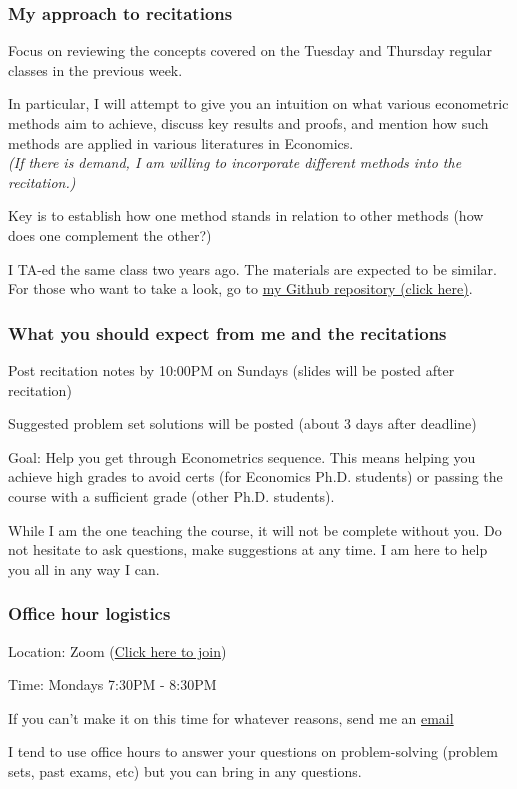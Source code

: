 \documentclass[aspectratio=169]{beamer}
\newenvironment{wideitemize}{\itemize\addtolength{\itemsep}{10pt}}{\enditemize}
\begin{document}
\begin{frame}
\frametitle{My approach to recitations}
\begin{wideitemize}
\item  Focus on reviewing the concepts covered on the Tuesday and Thursday regular classes in the previous week.
\item In particular, I will attempt to give you an intuition on what various econometric methods aim to achieve, discuss key results and proofs, and mention how such methods are applied in various literatures in Economics. \\
\textit{(If there is demand, I am willing to incorporate different methods into the recitation.)}
\item Key is to establish how one method stands in relation to other methods (how does one complement the other?)
\item I TA-ed the same class two years ago. The materials are expected to be similar. For those who want to take a look, go to \href{https://github.com/seunghunlee918/phd_econometrics}{my Github repository (click here)}.
 \end{wideitemize}
\end{frame}

\begin{frame}
\frametitle{What you should expect from me and the recitations}
\begin{wideitemize}
\item Post recitation notes by 10:00PM on Sundays (slides will be posted after recitation)
\item Suggested problem set solutions will be posted (about 3 days after deadline)
\item Goal: Help you get through Econometrics sequence. This means helping you achieve high grades to avoid certs (for Economics Ph.D. students) or  passing the course with a sufficient grade (other Ph.D. students).  
\item While I am the one teaching the course, it will not be complete without you. Do not hesitate to ask questions, make suggestions at any time. I am here to help you all in any way I can. 

 \end{wideitemize}
\end{frame}

\begin{frame}
\frametitle{Office hour logistics}
\begin{wideitemize}
\item Location: Zoom (\href{https://columbiauniversity.zoom.us/j/96949225512?pwd=bTgwKytIVHpmNVloU0hNOEFxQ3J3UT09}{Click here to join})
\item Time: Mondays 7:30PM - 8:30PM 
\item If you can't make it on this time for whatever reasons, send me an \href{mailto:sl4436@columbia.edu}{email}
\item I tend to use office hours to answer your questions on problem-solving (problem sets, past exams, etc) but you can bring in any questions.
 \end{wideitemize}
\end{frame}
\end{document}
